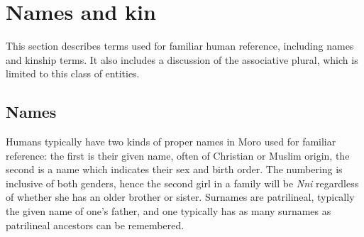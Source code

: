 


%


\section{Names and kin}

This section describes terms used for familiar human reference, including names and kinship terms. It also includes a discussion of the associative plural, which is limited to this class of entities.

\subsection{Names}\label{sec:ch6:names}

Humans typically have two kinds of proper names in Moro used for familiar reference: the first is their given name, often of Christian or Muslim origin, the second is a name which indicates their sex and birth order. The numbering is inclusive of both genders, hence the second girl in a family will be \textit{Nni} regardless of whether she has an older brother or sister. Surnames are patrilineal, typically the given name of one's father, and one typically has as many surnames as patrilineal ancestors can be remembered.

